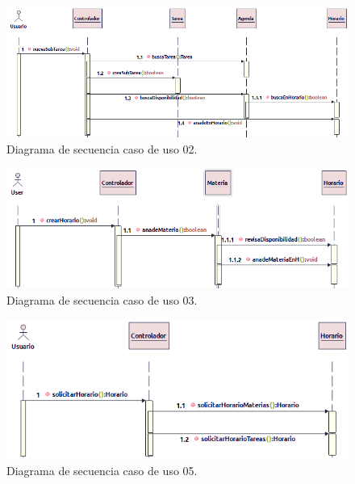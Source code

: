 \begin{figure}[H]
	\centering
	\includegraphics[width=0.7\linewidth]{diseno/requerimientos/imagenes/secuenciaE02.png} 
	\caption{Diagrama de secuencia caso de uso 02.}
	\label{fig:gantt}
\end{figure}

\begin{figure}[H]
	\centering
	\includegraphics[width=0.7\linewidth]{diseno/requerimientos/imagenes/secuenciaE03.png} 
	\caption{Diagrama de secuencia caso de uso 03.}
	\label{fig:gantt}
\end{figure}

\begin{figure}[H]
	\centering
	\includegraphics[width=0.7\linewidth]{diseno/requerimientos/imagenes/secuenciaE04.png} 
	\caption{Diagrama de secuencia caso de uso 05.}
	\label{fig:gantt}
\end{figure}

